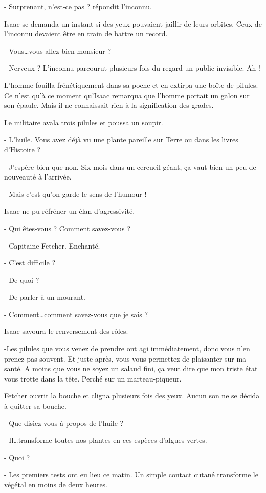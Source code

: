\documentclass[12pt]{book}
\begin{document}
-  Surprenant, n’est-ce pas ? répondit l'inconnu.


Isaac se demanda un instant si des yeux pouvaient jaillir de leurs orbites. Ceux de l’inconnu devaient être en train de battre un record.

- Vous…vous allez bien monsieur ?

- Nerveux ? L’inconnu parcourut plusieurs fois du regard un public invisible. Ah !

L’homme fouilla frénétiquement dans sa poche et en extirpa une boîte de pilules. Ce n’est qu’à ce moment qu’Isaac remarqua que l’homme portait un galon sur son épaule. Mais il ne connaissait rien à la signification des grades.

Le militaire avala trois pilules et poussa un soupir.


- L’huile. Vous avez déjà vu une plante pareille sur Terre ou dans les livres d’Histoire ?

-  J’espère bien que non. Six mois dans un cercueil géant, ça vaut bien un peu de nouveauté à l’arrivée.

- Mais c’est qu’on garde le sens de l’humour !

Isaac ne pu réfréner un élan d’agressivité.

-  Qui êtes-vous ? Comment savez-vous ?

 - Capitaine Fetcher. Enchanté.

- C’est difficile ?

- De quoi ?

- De parler à un mourant.

- Comment…comment savez-vous que je sais ?

Isaac savoura le renversement des rôles.

   -Les pilules que vous venez de prendre ont agi immédiatement, donc vous n’en prenez pas souvent. Et juste après, vous vous permettez de plaisanter sur ma santé. A moins que vous ne soyez un salaud fini, ça veut dire que mon triste état vous trotte dans la tête. Perché sur un marteau-piqueur.

Fetcher ouvrit la bouche et cligna plusieurs fois des yeux. Aucun son ne se décida à quitter sa bouche.

- Que disiez-vous à propos de l’huile ?

-  Il…transforme toutes nos plantes en ces espèces d'algues vertes.

- Quoi ?

- Les premiers tests ont eu lieu ce matin. Un simple contact cutané transforme le végétal en moins de deux heures.
\end{document}
